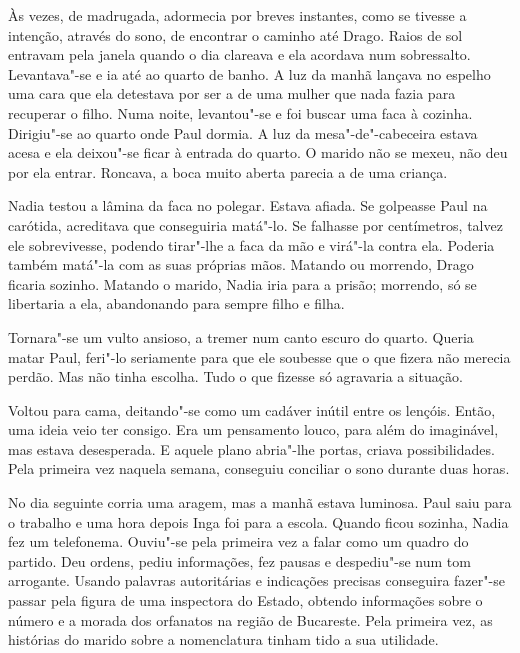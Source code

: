 Às vezes, de madrugada, adormecia por breves instantes, como se
tivesse a intenção, através do sono, de encontrar o caminho até Drago.
Raios de sol entravam pela janela quando o dia clareava e ela acordava
num sobressalto. Levantava"-se e ia até ao quarto de banho. A luz da
manhã lançava no espelho uma cara que ela detestava por ser a de uma
mulher que nada fazia para recuperar o filho. Numa noite, levantou"-se e
foi buscar uma faca à cozinha. Dirigiu"-se ao quarto onde Paul dormia.
A luz da mesa"-de"-cabeceira estava acesa e ela deixou"-se ficar à entrada
do quarto. O marido não se mexeu, não deu por ela entrar. Roncava, a
boca muito aberta parecia a de uma criança.

Nadia testou a lâmina da faca no polegar. Estava afiada. Se golpeasse
Paul na carótida, acreditava que conseguiria matá"-lo. Se falhasse por
centímetros, talvez ele sobrevivesse, podendo tirar"-lhe a faca da mão
e virá"-la contra ela. Poderia também matá"-la com as suas próprias mãos.
Matando ou morrendo, Drago ficaria sozinho. Matando o marido, Nadia iria
para a prisão; morrendo, só se libertaria a ela, abandonando para
sempre filho e filha.

Tornara"-se um vulto ansioso, a tremer num canto escuro do quarto. Queria
matar Paul, feri"-lo seriamente para que ele soubesse que o que fizera
não merecia perdão. Mas não tinha escolha. Tudo o que fizesse só
agravaria a situação.

Voltou para cama, deitando"-se como um cadáver inútil entre os lençóis.
Então, uma ideia veio ter consigo. Era um pensamento louco, para além do
imaginável, mas estava desesperada. E aquele plano abria"-lhe portas,
criava possibilidades. Pela primeira vez naquela semana, conseguiu conciliar o sono
durante duas horas.

No dia seguinte corria uma aragem, mas a manhã estava luminosa. Paul
saiu para o trabalho e uma hora depois Inga foi para a escola. Quando
ficou sozinha, Nadia fez um telefonema. Ouviu"-se pela primeira vez a
falar como um quadro do partido. Deu ordens, pediu informações, fez
pausas e despediu"-se num tom arrogante. Usando palavras autoritárias e
indicações precisas conseguira fazer"-se passar pela figura de uma
inspectora do Estado, obtendo informações sobre o número e a morada dos
orfanatos na região de Bucareste. Pela primeira vez, as histórias do
marido sobre a nomenclatura tinham tido a sua utilidade.

